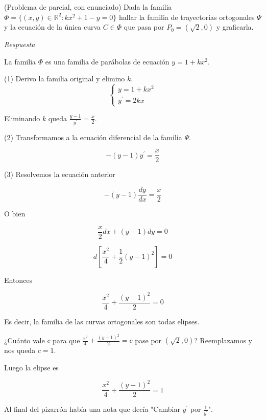 \begin{exercise}

(Problema de parcial, con enunciado) Dada la familia $\Phi = \lbrace (x,y) \in \mathbb{R}^2 : kx^2 + 1 - y = 0 \rbrace$ hallar la familia de trayectorias ortogonales $\Psi$ y la ecuaci\'on de la \'unica curva $C \in \Phi$ que pasa por $P_0 = (\sqrt{2}, 0)$ y graficarla.

\emph{Respuesta}

La familia $\Phi$ es una familia de par\'abolas de ecuaci\'on $y = 1 + kx^2$.

(1) Derivo la familia original y elimino $k$.
\begin{equation}
\begin{cases}
	y = 1 + kx^2 \\
	y^{\prime} = 2kx
\end{cases}
\end{equation}

Eliminando $k$ queda $\frac{y - 1}{y^{\prime}} = \frac{x}{2}$.

(2) Transformamos a la ecuaci\'on diferencial de la familia $\Psi$.

$$
-(y-1)y^{\prime} = \frac{x}{2}
$$

(3) Resolvemos la ecuaci\'on anterior

$$
-(y-1)\frac{dy}{dx} = \frac{x}{2}
$$

O bien

$$
\frac{x}{2}dx + (y-1) dy = 0
$$

$$
d\left[ \frac{x^2}{4} + \frac{1}{2}(y-1)^2\right] = 0
$$

Entonces

$$
\frac{x^2}{4} + \frac{(y-1)^2}{2} = 0
$$

Es decir, la familia de las curvas ortogonales son todas elipses. %

¿Cu\'anto vale $c$ para que $\frac{x^2}{4} + \frac{(y-1)^2}{2} = c$ pase por $(\sqrt{2}, 0)$? Reemplazamos y nos queda $c = 1$.

Luego la elipse es

$$
\frac{x^2}{4} + \frac{(y-1)^2}{2} = 1
$$

Al final del pizarr\'on hab\'ia una nota que dec\'ia "Cambiar $y^{\prime}$ por $\frac{1}{y^{\prime}}$".

\end{exercise}

